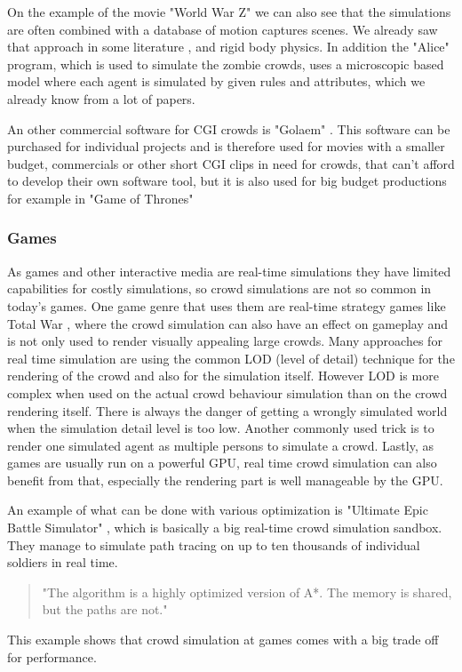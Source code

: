\documentclass{acmsiggraph}               %
\begin{document}
On the example of the movie "World War Z" we can also see that the simulations are often combined with a database of motion captures scenes. We already saw that approach in some literature \cite{thalmann_crowd_2013}, and rigid body physics. In addition the "Alice" program, which is used to simulate the zombie crowds, uses a microscopic based model where each agent is simulated by given rules and attributes, which we already know from a lot of papers. \cite{wired_worldwarz_doku} 

An other commercial software for CGI crowds is "Golaem" \cite{golaem_website}. This software can be purchased for individual projects and is therefore used for movies with a smaller budget, commercials or other short CGI clips in need for crowds, that can't afford to develop their own software tool, but it is also used for big budget productions for example in "Game of Thrones" \cite{golaem_got_vid}

\subsubsection{Games}

As games and other interactive media are real-time simulations they have limited capabilities for costly simulations, so crowd simulations are not so common in today's games. One game genre that uses them are real-time strategy games like Total War \cite{total_war_website}, where the crowd simulation can also have an effect on gameplay and is not only used to render visually appealing large crowds. 
Many approaches for real time simulation are using the common LOD (level of detail) technique for the rendering of the crowd and also for the simulation itself. However LOD is more complex when used on the actual crowd behaviour simulation than on the crowd rendering itself. There is always the danger of getting a wrongly simulated world when the simulation detail level is too low. Another commonly used trick is to render one simulated agent as multiple persons to simulate a crowd. Lastly, as games are usually run on a powerful GPU, real time crowd simulation can also benefit from that, especially the rendering part is well manageable by the GPU. \cite{thalmann_crowd_2013}

An example of what can be done with various optimization is "Ultimate Epic Battle Simulator" \cite{ultimeEpicBattleSim_video} , which is basically a big real-time crowd simulation sandbox. They manage to simulate path tracing on up to ten thousands of individual soldiers in real time. 
\begin{quote}
"The algorithm is a highly optimized version of A*.  \label{term:A*Usage} The memory is shared, but the paths are not." \cite{ultimeEpicBattleSim_video}
\end{quote} This example shows that crowd simulation at games comes with a big trade off for performance. 
\end{document}
